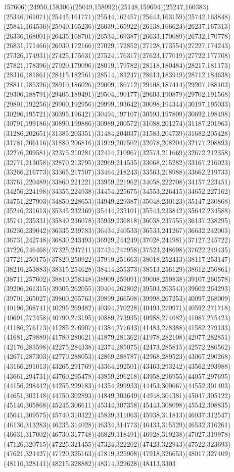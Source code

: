 \documentclass[conference]{IEEEtran}
\begin{document}
157606)(24950,158306)(25049,158992)(25148,159694)(25247,160383)(25346,161071)(25445,161771)(25544,162457)(25643,163159)(25742,163848)(25841,164536)(25940,165236)(26039,165922)(26138,166624)(26237,167313)(26336,168001)(26435,168701)(26534,169387)(26633,170089)(26732,170778)(26831,171466)(26930,172166)(27029,172852)(27128,173554)(27227,174243)(27326,174931)(27425,175631)(27524,176317)(27623,177019)(27722,177708)(27821,178396)(27920,179096)(28019,179782)(28118,180484)(28217,181173)(28316,181861)(28415,182561)(28514,183247)(28613,183949)(28712,184638)(28811,185326)(28910,186026)(29009,186712)(29108,187414)(29207,188103)(29306,188791)(29405,189491)(29504,190177)(29603,190879)(29702,191568)(29801,192256)(29900,192956)(29999,193642)(30098,194344)(30197,195033)(30296,195721)(30395,196421)(30494,197107)(30593,197809)(30692,198498)(30791,199186)(30890,199886)(30989,200572)(31088,201274)(31187,201963)(31286,202651)(31385,203351)(31484,204037)(31583,204739)(31682,205428)(31781,206116)(31880,206816)(31979,207502)(32078,208204)(32177,208893)(32276,209581)(32375,210281)(32474,210967)(32573,211669)(32672,212358)(32771,213058)(32870,213795)(32969,214535)(33068,215282)(33167,216023)(33266,216773)(33365,217507)(33464,218243)(33563,218988)(33662,219733)(33761,220489)(33860,221221)(33959,221962)(34058,222708)(34157,223451)(34256,224198)(34355,224938)(34454,225675)(34553,226415)(34652,227162)(34751,227903)(34850,228653)(34949,229387)(35048,230123)(35147,230868)(35246,231613)(35345,232369)(35444,233101)(35543,233842)(35642,234588)(35741,235331)(35840,236078)(35939,236818)(36038,237555)(36137,238295)(36236,239042)(36335,239783)(36434,240533)(36533,241267)(36632,242003)(36731,242748)(36830,243493)(36929,244249)(37028,244981)(37127,245722)(37226,246468)(37325,247211)(37424,247958)(37523,248698)(37622,249435)(37721,250175)(37820,250922)(37919,251663)(38018,252413)(38117,253147)(38216,253883)(38315,254628)(38414,255373)(38513,256129)(38612,256861)(38711,257602)(38810,258348)(38909,259091)(39008,259838)(39107,260578)(39206,261315)(39305,262055)(39404,262802)(39503,263543)(39602,264293)(39701,265027)(39800,265763)(39899,266508)(39998,267253)(40097,268009)(40196,268741)(40295,269482)(40394,270228)(40493,270971)(40592,271718)(40691,272458)(40790,273195)(40889,273935)(40988,274682)(41087,275423)(41186,276173)(41285,276907)(41384,277643)(41483,278388)(41582,279133)(41681,279889)(41780,280621)(41879,281362)(41978,282108)(42077,282851)(42176,283598)(42275,284338)(42374,285075)(42473,285815)(42572,286562)(42671,287303)(42770,288053)(42869,288787)(42968,289523)(43067,290268)(43166,291013)(43265,291769)(43364,292501)(43463,293242)(43562,293988)(43661,294731)(43760,295478)(43859,296218)(43958,296955)(44057,297695)(44156,298442)(44255,299183)(44354,299933)(44453,300667)(44552,301403)(44651,302148)(44750,302893)(44849,303649)(44948,304381)(45047,305122)(45146,305868)(45245,306611)(45344,307358)(45443,308098)(45542,308835)(45641,309575)(45740,310322)(45839,311063)(45938,311813)(46037,312547)(46136,313283)(46235,314028)(46334,314773)(46433,315529)(46532,316261)(46631,317002)(46730,317748)(46829,318491)(46928,319238)(47027,319978)(47126,320715)(47225,321455)(47324,322202)(47423,322943)(47522,323693)(47621,324427)(47720,325163)(47819,325908)(47918,326653)(48017,327409)(48116,328141)(48215,328882)(48314,329628)(48413,3303
\end{document}
